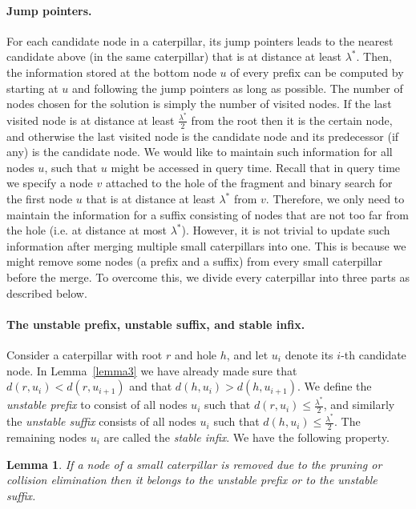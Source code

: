 \documentclass[11pt,a4paper]{article}
\newtheorem{lemma}{Lemma}
\theoremstyle{definition}
\theoremstyle{remark}
\begin{document}
\paragraph{Jump pointers.} For each candidate node in a caterpillar, its jump pointers leads to the nearest
candidate above (in the same caterpillar) that is at distance at least $\lambda^{*}$. Then, the information
stored at the bottom node $u$ of every prefix can be computed by starting at $u$ and following
the jump pointers as long as possible. The number of nodes chosen for the solution is simply the number of visited
nodes. If the last visited node is at distance at least $\frac{\lambda^{*}}{2}$ from the root then it is
the certain node, and otherwise the last visited node is the candidate node and its predecessor
(if any) is the candidate node. We would like to maintain such information for all nodes $u$,
such that $u$ might be accessed in query time. Recall that in query time we specify
a node $v$ attached to the hole of the fragment and binary search for the first node $u$ that
is at distance at least $\lambda^{*}$ from $v$. Therefore, we only need to maintain the information
for a suffix consisting of nodes that are not too far from the hole (i.e. at distance at most $\lambda^{*}$). However, it is not
 trivial to update such information after merging multiple small caterpillars into
one. This is because we might remove some nodes (a prefix and a suffix)
from every small caterpillar before the merge. To overcome this, we divide every caterpillar into
three parts as described below.

\paragraph{The unstable prefix,  unstable  suffix, and stable infix.} 


Consider a caterpillar with root $r$ and hole $h$, and let $u_{i}$ denote its $i$-th candidate node. In Lemma~\ref{lemma3} we have already made sure that $d(r,u_{i}) < d(r,u_{i+1})$
and that $d(h,u_{i}) > d(h,u_{i+1})$. We define the \emph{unstable prefix} to
consist of all nodes $u_{i}$ such that $d(r,u_{i})\leq \frac{\lambda^{*}}{2}$, and similarly the
\emph{unstable suffix} consists of all nodes $u_{i}$ such that $d(h,u_{i})\leq \frac{\lambda^{*}}{2}$.
The remaining nodes $u_{i}$ are called the \emph{stable infix}.  We have the following property.

\begin{lemma}
\label{stable infix}
If a node of a small caterpillar is removed due to the pruning or collision elimination then it
belongs to the unstable prefix or to the unstable suffix.
\end{lemma}
\end{document}
